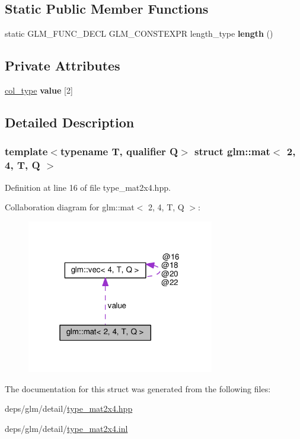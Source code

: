 \subsection*{Static Public Member Functions}
\begin{DoxyCompactItemize}
\item 
\mbox{\label{structglm_1_1mat_3_012_00_014_00_01T_00_01Q_01_4_a52f7dc5b855a6dab6b479a3bcf29357b}} 
static G\+L\+M\+\_\+\+F\+U\+N\+C\+\_\+\+D\+E\+CL G\+L\+M\+\_\+\+C\+O\+N\+S\+T\+E\+X\+PR length\+\_\+type {\bfseries length} ()
\end{DoxyCompactItemize}
\subsection*{Private Attributes}
\begin{DoxyCompactItemize}
\item 
\mbox{\label{structglm_1_1mat_3_012_00_014_00_01T_00_01Q_01_4_af1b1c45fac74697c901db6f2909b24f3}} 
\hyperlink{structglm_1_1vec_3_014_00_01T_00_01Q_01_4}{col\+\_\+type} {\bfseries value} \mbox{[}2\mbox{]}
\end{DoxyCompactItemize}


\subsection{Detailed Description}
\subsubsection*{template$<$typename T, qualifier Q$>$\newline
struct glm\+::mat$<$ 2, 4, T, Q $>$}



Definition at line 16 of file type\+\_\+mat2x4.\+hpp.



Collaboration diagram for glm\+:\+:mat$<$ 2, 4, T, Q $>$\+:
\nopagebreak
\begin{figure}[H]
\begin{center}
\leavevmode
\includegraphics[width=232pt]{de/dbb/structglm_1_1mat_3_012_00_014_00_01T_00_01Q_01_4__coll__graph}
\end{center}
\end{figure}


The documentation for this struct was generated from the following files\+:\begin{DoxyCompactItemize}
\item 
deps/glm/detail/\hyperlink{type__mat2x4_8hpp}{type\+\_\+mat2x4.\+hpp}\item 
deps/glm/detail/\hyperlink{type__mat2x4_8inl}{type\+\_\+mat2x4.\+inl}\end{DoxyCompactItemize}
